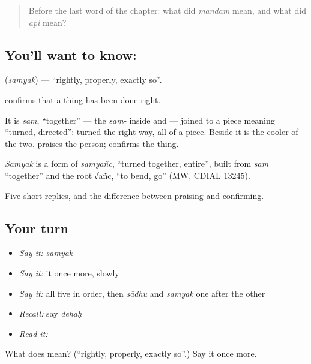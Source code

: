 \label{lesson:SA-C36-rightly}



\begin{quote}
Before the last word of the chapter: what did \emph{mandam} mean, and what did \emph{api} mean?
\end{quote}

\subsection*{You'll want to know: }
\textbf{} (\emph{samyak}) — \textquotedblleft{}rightly, properly, exactly so\textquotedblright{}.

\textbf{} confirms that a thing has been done right.

It is \emph{sam}, \textquotedblleft{}together\textquotedblright{} — the \emph{sam-} inside \textbf{} and \textbf{} — joined to a piece meaning \textquotedblleft{}turned, directed\textquotedblright{}: turned the right way, all of a piece. Beside \textbf{} it is the cooler of the two. \textbf{} praises the person; \textbf{} confirms the thing.

\begin{cousinweb}
\emph{Samyak} is a form of \emph{samyañc}, \textquotedblleft{}turned together, entire\textquotedblright{}, built from \emph{sam} \textquotedblleft{}together\textquotedblright{} and the root √añc, \textquotedblleft{}to bend, go\textquotedblright{} (MW, CDIAL 13245).
\end{cousinweb}

\begin{grammarlens}[title={What you've built}]
Five short replies, and the difference between praising and confirming.
\end{grammarlens}

\subsection*{Your turn}
\begin{itemize}
\raggedright
  \item \emph{Say it:} \emph{samyak}
  \item \emph{Say it:} it once more, slowly
  \item \emph{Say it:} all five in order, then \emph{sādhu} and \emph{samyak} one after the other
  \item \emph{Recall:} say \emph{dehaḥ}
  \item \emph{Read it:} \textbf{}
\end{itemize}

\begin{tcolorbox}[breakable,colback=teal!4,colframe=teal!35!black,title={Before you move on}]
What does  mean? (\textquotedblleft{}rightly, properly, exactly so\textquotedblright{}.) Say it once more.
\end{tcolorbox}

